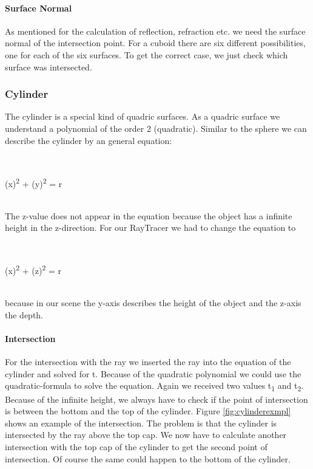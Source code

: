\documentclass[10pt]{scrartcl}
\begin{document}
\paragraph{Surface Normal}

As mentioned for the calculation of reflection, refraction etc. we need the surface normal of the intersection point. For a cuboid there are six different possibilities, one for each of the six surfaces. To get the correct case, we just check which surface was intersected. 

\subsubsection{Cylinder}

The cylinder is a special kind of quadric surfaces. As a quadric surface we understand a polynomial of the order 2 (quadratic). Similar to the sphere we can describe the cylinder by an general equation:

\\
\begin{center}

(x)\textsuperscript{2} + (y)\textsuperscript{2} = r

\end{center}
\\

The z-value does not appear in the equation because the object has a infinite height in the z-direction. For our RayTracer we had to change the equation to 

\\
\begin{center}
(x)\textsuperscript{2} + (z)\textsuperscript{2} = r
\end{center}
\\

because in our scene the y-axis describes the height of the object and the z-axis the depth.

\paragraph{Intersection}

For the intersection with the ray we inserted the ray into the equation of the cylinder and solved for t. Because of the quadratic polynomial we could use the quadratic-formula to solve the equation. Again we received two values  t\textsubscript{1} and t\textsubscript{2}. Because of the infinite height, we always have to check if the point of intersection is between the bottom and the top of the cylinder. Figure \ref{fig:cylinderexmpl} shows an example of the intersection. The problem is that the cylinder is intersected by the ray above the top cap. We now have to calculate another intersection with the top cap of the cylinder to get the second point of intersection. Of course the same could happen to the bottom of the cylinder.
\end{document}

